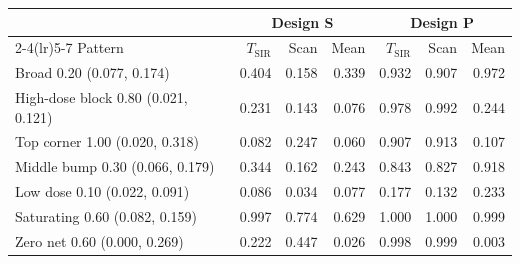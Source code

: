 \begin{tabular}{@{}lrrrrrr@{}}
\toprule
 & \multicolumn{3}{c}{Design S} & \multicolumn{3}{c}{Design P}\\
\cmidrule(lr){2-4}\cmidrule(lr){5-7}
Pattern & $T_{\mathrm{SIR}}$ & Scan & Mean & $T_{\mathrm{SIR}}$ & Scan & Mean\\
\midrule
Broad 0.20 (0.077, 0.174) & 0.404 & 0.158 & 0.339 & 0.932 & 0.907 & 0.972\\
High-dose block 0.80 (0.021, 0.121) & 0.231 & 0.143 & 0.076 & 0.978 & 0.992 & 0.244\\
Top corner 1.00 (0.020, 0.318) & 0.082 & 0.247 & 0.060 & 0.907 & 0.913 & 0.107\\
Middle bump 0.30 (0.066, 0.179) & 0.344 & 0.162 & 0.243 & 0.843 & 0.827 & 0.918\\
Low dose 0.10 (0.022, 0.091) & 0.086 & 0.034 & 0.077 & 0.177 & 0.132 & 0.233\\
Saturating 0.60 (0.082, 0.159) & 0.997 & 0.774 & 0.629 & 1.000 & 1.000 & 0.999\\
Zero net 0.60 (0.000, 0.269) & 0.222 & 0.447 & 0.026 & 0.998 & 0.999 & 0.003\\
\bottomrule
\end{tabular}
